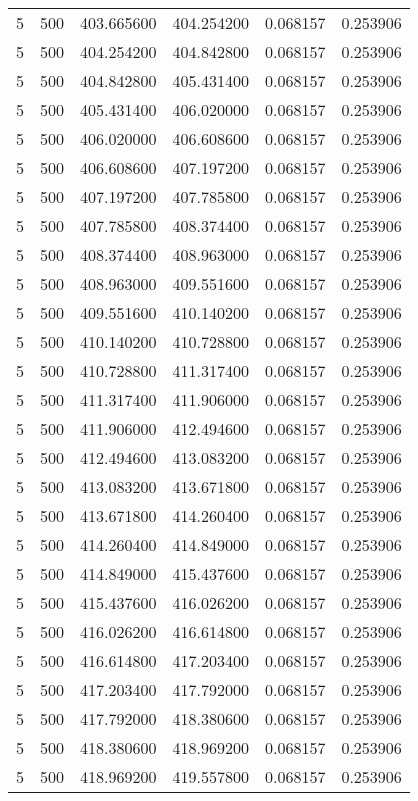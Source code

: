 \begin{longtable}{rrrrrr}
5 & 500 & 403.665600 & 404.254200 & 0.068157 & 0.253906 \\
5 & 500 & 404.254200 & 404.842800 & 0.068157 & 0.253906 \\
5 & 500 & 404.842800 & 405.431400 & 0.068157 & 0.253906 \\
5 & 500 & 405.431400 & 406.020000 & 0.068157 & 0.253906 \\
5 & 500 & 406.020000 & 406.608600 & 0.068157 & 0.253906 \\
5 & 500 & 406.608600 & 407.197200 & 0.068157 & 0.253906 \\
5 & 500 & 407.197200 & 407.785800 & 0.068157 & 0.253906 \\
5 & 500 & 407.785800 & 408.374400 & 0.068157 & 0.253906 \\
5 & 500 & 408.374400 & 408.963000 & 0.068157 & 0.253906 \\
5 & 500 & 408.963000 & 409.551600 & 0.068157 & 0.253906 \\
5 & 500 & 409.551600 & 410.140200 & 0.068157 & 0.253906 \\
5 & 500 & 410.140200 & 410.728800 & 0.068157 & 0.253906 \\
5 & 500 & 410.728800 & 411.317400 & 0.068157 & 0.253906 \\
5 & 500 & 411.317400 & 411.906000 & 0.068157 & 0.253906 \\
5 & 500 & 411.906000 & 412.494600 & 0.068157 & 0.253906 \\
5 & 500 & 412.494600 & 413.083200 & 0.068157 & 0.253906 \\
5 & 500 & 413.083200 & 413.671800 & 0.068157 & 0.253906 \\
5 & 500 & 413.671800 & 414.260400 & 0.068157 & 0.253906 \\
5 & 500 & 414.260400 & 414.849000 & 0.068157 & 0.253906 \\
5 & 500 & 414.849000 & 415.437600 & 0.068157 & 0.253906 \\
5 & 500 & 415.437600 & 416.026200 & 0.068157 & 0.253906 \\
5 & 500 & 416.026200 & 416.614800 & 0.068157 & 0.253906 \\
5 & 500 & 416.614800 & 417.203400 & 0.068157 & 0.253906 \\
5 & 500 & 417.203400 & 417.792000 & 0.068157 & 0.253906 \\
5 & 500 & 417.792000 & 418.380600 & 0.068157 & 0.253906 \\
5 & 500 & 418.380600 & 418.969200 & 0.068157 & 0.253906 \\
5 & 500 & 418.969200 & 419.557800 & 0.068157 & 0.253906 \\

\end{longtable}
